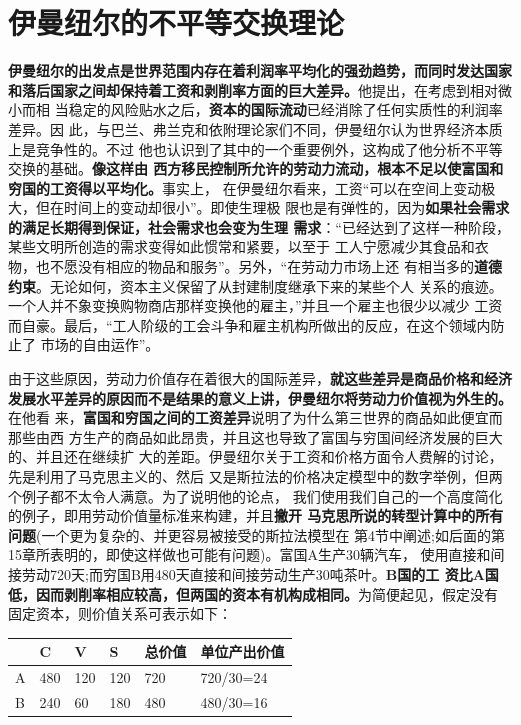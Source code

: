 \section{伊曼纽尔的不平等交换理论}

\textbf{伊曼纽尔的出发点是世界范围内存在着利润率平均化的强劲趋势，而同时发达国家
  和落后国家之间却保持着工资和剥削率方面的巨大差异。}他提出，在考虑到相对微小而相
当稳定的风险贴水之后，\textbf{资本的国际流动}已经消除了任何实质性的利润率差异。因
此，与巴兰、弗兰克和依附理论家们不同，伊曼纽尔认为世界经济本质上是竞争性的。不过
他也认识到了其中的一个重要例外，这构成了他分析不平等交换的基础。\textbf{像这样由
  西方移民控制所允许的劳动力流动，根本不足以使富国和穷国的工资得以平均化。}事实上，
在伊曼纽尔看来，工资“可以在空间上变动极大，但在时间上的变动却很小”。即使生理极
限也是有弹性的，因为\textbf{如果社会需求的满足长期得到保证，社会需求也会变为生理
  需求}：“已经达到了这样一种阶段，某些文明所创造的需求变得如此惯常和紧要，以至于
工人宁愿减少其食品和衣物，也不愿没有相应的物品和服务”。另外，“在劳动力市场上还
有相当多的\textbf{道德约束}。无论如何，资本主义保留了从封建制度继承下来的某些个人
关系的痕迹。一个人并不象变换购物商店那样变换他的雇主，”并且一个雇主也很少以减少
工资而自豪。最后，“工人阶级的工会斗争和雇主机构所做出的反应，在这个领域内防止了
市场的自由运作”。

由于这些原因，劳动力价值存在着很大的国际差异，\textbf{就这些差异是商品价格和经济
  发展水平差异的原因而不是结果的意义上讲，伊曼纽尔将劳动力价值视为外生的。}在他看
来，\textbf{富国和穷国之间的工资差异}说明了为什么第三世界的商品如此便宜而那些由西
方生产的商品如此昂贵，并且这也导致了富国与穷国间经济发展的巨大的、并且还在继续扩
大的差距。伊曼纽尔关于工资和价格方面令人费解的讨论，先是利用了马克思主义的、然后
又是斯拉法的价格决定模型中的数字举例，但两个例子都不太令人满意。为了说明他的论点，
我们使用我们自己的一个高度简化的例子，即用劳动价值量标准来构建，并且\textbf{撇开
  马克思所说的转型计算中的所有问题}(一个更为复杂的、并更容易被接受的斯拉法模型在
第4节中阐述;如后面的第15章所表明的，即使这样做也可能有问题)。富国A生产30辆汽车，
使用直接和间接劳动720天;而穷国B用480天直接和间接劳动生产30吨茶叶。\textbf{B国的工
  资比A国低，因而剥削率相应较高，但两国的资本有机构成相同。}为简便起见，假定没有
固定资本，则价值关系可表示如下：

\begin{table}[H]
\centering
\begin{tabular}{@{}llllll@{}}
\toprule
  & C   & V   & S   & 总价值 & 单位产出价值    \\ \midrule
A & 480 & 120 & 120 & 720 & 720/30=24 \\
B & 240 & 60  & 180 & 480 & 480/30=16 \\ \bottomrule
\end{tabular}
\end{table}

